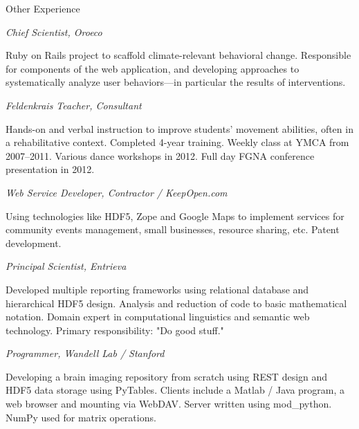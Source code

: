 \begin{rubric}{Other Experience}


\entry*[2012--2014] \emph{Chief Scientist, Oroeco}
    \par Ruby on Rails project to scaffold climate-relevant behavioral change.
    Responsible for components of the web application, and developing approaches
    to systematically analyze user behaviors---in particular the results of
    interventions.

\entry*[2007--present] \emph{Feldenkrais Teacher, Consultant}
    \par  Hands-on and verbal instruction to improve students' movement
    abilities, often in a rehabilitative context.
    Completed 4-year training. Weekly class at YMCA from 2007--2011. Various
    dance workshops in 2012. Full day FGNA conference presentation in 2012.


\entry*[2004--2013] \emph{Web Service Developer, Contractor / KeepOpen.com}
    \par Using technologies like HDF5, Zope and Google Maps to implement services
    for community events management, small businesses, resource sharing, etc.
    Patent development.

\entry*[2006--2007] \emph{Principal Scientist, Entrieva}
    \par Developed multiple reporting frameworks using relational database and
    hierarchical HDF5 design.  Analysis and reduction of code to basic
    mathematical notation.  Domain expert in computational linguistics and
    semantic web technology.  Primary responsibility: "Do good stuff."

\entry*[2006] \emph{Programmer, Wandell Lab / Stanford}
    \par Developing a brain imaging repository from scratch using REST design
    and HDF5 data storage using PyTables.  Clients include a Matlab /
    Java program, a web browser and mounting via WebDAV.  Server
    written using mod_python.  NumPy used for matrix operations.


\end{rubric}
